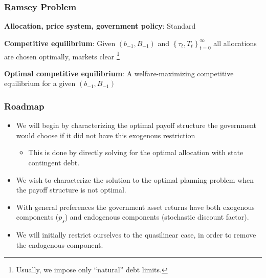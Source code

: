 \documentclass{beamer}
\begin{document}
\begin{frame}
 \frametitle{Ramsey Problem}

\begin{definition}
\textbf{Allocation, price system, government policy}: Standard

\end{definition}

\begin{definition}
\textbf{Competitive equilibrium}: Given $\left(b_{-1},B_{-1}\right) $ and $\left\{ \tau _{t},T_{t}\right\} _{t=0}^{\infty }$
all allocations are chosen optimally, markets clear \footnote{Usually, we impose only  ``natural'' debt limits. }
\end{definition}

\begin{definition}
\textbf{Optimal competitive equilibrium}: A welfare-maximizing competitive
equilibrium for a given $\left( b_{-1},B_{-1}\right) $
\end{definition}

 \end{frame}
 
\begin{frame}
\frametitle{Roadmap}
	\begin{itemize}
		\item  We will begin by characterizing the optimal payoff structure the government would choose if it did not have this exogenous restriction
		\begin{itemize}
			\item  This is done by directly solving for the optimal allocation with state contingent debt.
		\end{itemize}
		\item We wish to characterize the solution to the optimal planning problem when the payoff structure is not optimal.
		\item  With general preferences the government asset returns have both exogenous components ($p_s$) and endogenous components (stochastic discount factor).
		\item  We will initially restrict ourselves to the quasilinear case, in order to remove the endogenous component.
	\end{itemize}
\end{frame}
 
\end{document}
